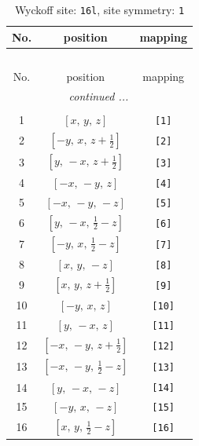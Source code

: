 \documentclass[fleqn,8pt]{jsarticle}
\begin{document}
\begin{longtable}{ccc}
\caption{Wyckoff site: {\tt 16l}, site symmetry: {\tt 1}}
 \\
 \hline \hline
No. & position & mapping \\ \hline \endfirsthead

\multicolumn{2}{l}{\tablename\ \thetable{}} \\
 \hline \hline
No. & position & mapping \\ \hline \endhead

 \hline \hline
\multicolumn{2}{r}{\footnotesize\it continued ...} \\ \endfoot

 \hline \hline
\multicolumn{2}{r}{} \\ \endlastfoot

1 & $\left[ x,\, y,\, z \right]$ & {\tt [1]} \\ \hline
2 & $\left[ - y,\, x,\, z + \frac{1}{2} \right]$ & {\tt [2]} \\ \hline
3 & $\left[ y,\, - x,\, z + \frac{1}{2} \right]$ & {\tt [3]} \\ \hline
4 & $\left[ - x,\, - y,\, z \right]$ & {\tt [4]} \\ \hline
5 & $\left[ - x,\, - y,\, - z \right]$ & {\tt [5]} \\ \hline
6 & $\left[ y,\, - x,\, \frac{1}{2} - z \right]$ & {\tt [6]} \\ \hline
7 & $\left[ - y,\, x,\, \frac{1}{2} - z \right]$ & {\tt [7]} \\ \hline
8 & $\left[ x,\, y,\, - z \right]$ & {\tt [8]} \\ \hline
9 & $\left[ x,\, y,\, z + \frac{1}{2} \right]$ & {\tt [9]} \\ \hline
10 & $\left[ - y,\, x,\, z \right]$ & {\tt [10]} \\ \hline
11 & $\left[ y,\, - x,\, z \right]$ & {\tt [11]} \\ \hline
12 & $\left[ - x,\, - y,\, z + \frac{1}{2} \right]$ & {\tt [12]} \\ \hline
13 & $\left[ - x,\, - y,\, \frac{1}{2} - z \right]$ & {\tt [13]} \\ \hline
14 & $\left[ y,\, - x,\, - z \right]$ & {\tt [14]} \\ \hline
15 & $\left[ - y,\, x,\, - z \right]$ & {\tt [15]} \\ \hline
16 & $\left[ x,\, y,\, \frac{1}{2} - z \right]$ & {\tt [16]} \\
\end{longtable}
\end{document}

